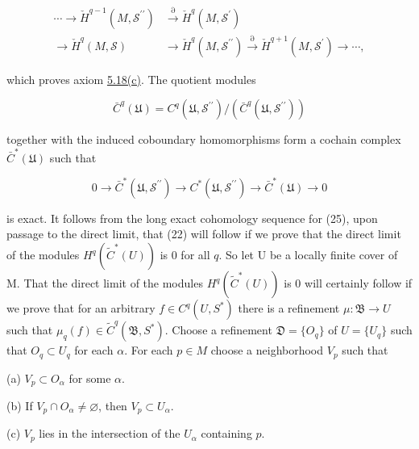 \begin{equation}
\tag{23}\label{eq:5.33:23}
\begin{aligned}\cdots\longrightarrow\check{H}^{q-1}(M,\mathcal{S}^{\prime\prime})&\xrightarrow{\partial}\check{H}^{q}(M,\mathcal{S}^{\prime})\\ \longrightarrow\check{H}^{q}(M,\mathcal{S})&\longrightarrow\check{H}^{q}(M,\mathcal{S}^{\prime\prime})\xrightarrow{\partial}\check{H}^{q+1}(M,\mathcal{S}^{\prime})\longrightarrow\cdots,\end{aligned}
\end{equation}

which proves axiom \hyperref[thm:5.18]{5.18(c)}. The quotient modules

\begin{equation}
\tag{24}\label{eq:5.33:24}
\bar{C}^{q}(\mathfrak{U})=C^{q}(\mathfrak{U},\mathcal{S}^{\prime\prime})/(\bar{C}^{q}(\mathfrak{U},\mathcal{S}^{\prime\prime}))
\end{equation}

together with the induced coboundary homomorphisms form a cochain complex  $\bar{C}^{*}(\mathfrak{U})$ such that

\begin{equation}
\tag{25}\label{eq:5.33:25}
0\to\bar{C}^{*}(\mathfrak{U},\mathcal{S}^{\prime\prime})\to C^{*}(\mathfrak{U},\mathcal{S}^{\prime\prime})\to\bar{C}^{*}(\mathfrak{U})\to0
\end{equation}

is exact. It follows from the long exact cohomology sequence for (25), upon passage to the direct limit, that (22) will follow if we prove that the direct limit of the modules  $ H^q(\widetilde{C}^*(U)) $ is 0 for all $q$. So let U be a locally finite cover of M. That the direct limit of the modules  $ H^q(\widetilde{C}^*(U)) $ is 0 will certainly follow if we prove that for an arbitrary  $ f \in C^q(U, S^*) $ there is a refinement  $ \mu: \mathfrak{B} \to U $ such that  $ \mu_q(f) \in \widetilde{C}^q(\mathfrak{B}, S^*) $. Choose a refinement  $ \mathfrak{D} = \{O_q\} $ of  $ U = \{U_q\} $ such that  $ O_q \subset U_q $ for each  $ \alpha $. For each  $ p \in M $ choose a neighborhood  $ V_p $ such that

(a)  $V_{p}\subset O_{\alpha}$ for some $\alpha$.

(b) If  $V_{p}\cap O_{\alpha}\neq\varnothing$, then $V_{p}\subset U_{\alpha}$.

(c)  $V_{p}$ lies in the intersection of the $U_{\alpha}$ containing $p$.

